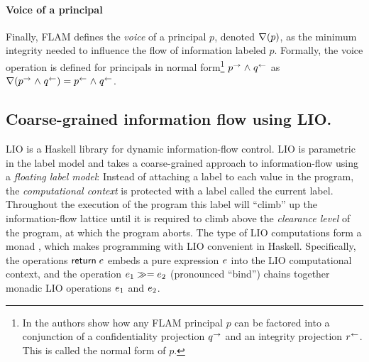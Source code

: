 \paragraph{Voice of a principal}
Finally, FLAM defines the \emph{voice} of a principal $p$, denoted $\nabla(p)$, as the minimum integrity needed to influence the flow of information labeled $p$. Formally, the voice operation is defined for principals in normal form\footnote{In \cite{Arden:2015:FA:2859845.2859998} the authors show how any FLAM principal $p$ can be factored into a conjunction of a confidentiality projection $q^{\rightarrow}$ and an integrity projection $r^{\leftarrow}$. This is called the normal form of $p$.} $p^{\rightarrow} \mathrel{\land} q^{\leftarrow}$ as $\nabla(p^{\rightarrow} \mathrel{\land} q^{\leftarrow}) = p^{\leftarrow} \mathrel{\land} q^{\leftarrow}$.

\subsection{Coarse-grained information flow using LIO.}
LIO \cite{SRMMlio} is a Haskell library for dynamic information-flow control. LIO is parametric in the label model and takes a coarse-grained approach to information-flow using a \emph{floating label model}: Instead of attaching a label to each value in the program, the \emph{computational context} is protected with a label called the current label. Throughout the execution of the program this label will ``climb'' up the information-flow lattice until it is required to climb above the \emph{clearance level} of the program, at which the program aborts. The type of LIO computations form a monad \cite{Wadler:1995:MFP:647698.734146}, which makes programming with LIO convenient in Haskell. Specifically, the operations $\mathsf{return}\;e$ embeds a pure expression $e$ into the LIO computational context, and the operation $e_1 \gg= e_2$ (pronounced ``bind'') chains together monadic LIO operations $e_1$ and $e_2$.

